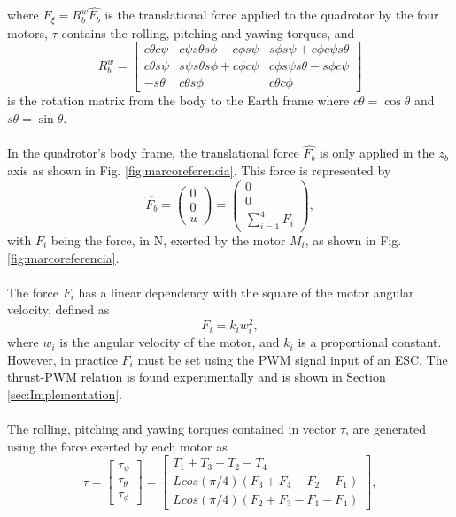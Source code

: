 where $F_{\xi}=R_{b}^{w}\hat{F_{b}}$ is the translational force applied to the quadrotor by the four motors, $\tau$ contains the rolling, pitching and yawing torques, and 
\begin{equation}
R_{b}^{w} = \begin{bmatrix}
c\theta c\psi & c\psi s\theta s\phi-c\phi s\psi & s\phi s\psi+c\phi c\psi s\theta\\
c\theta s\psi & s\psi s\theta s\phi+c\phi c\psi & c\phi s\psi s\theta - s\phi c\psi\\
-s\theta & c\theta s\phi & c\theta c\phi
\end{bmatrix}
\end{equation}
is the rotation matrix from the body to the Earth frame where $c\theta = \cos\theta$ and $s\theta = \sin\theta$.
\\\\
In the quadrotor's body frame, the translational force $\hat{F_{b}}$ is only applied in the $z_{b}$ axis as shown in Fig. \ref{fig:marcoreferencia}. This force is represented by
\begin{equation}
	\hat{F_{b}}=\begin{pmatrix}
	0\\
	0\\
	u
	\end{pmatrix} = \begin{pmatrix}
	0\\
	0\\
	\sum_{i=1}^{4}F_{i}
	\end{pmatrix}  ,
 \label{ec:fuerzas}
 \end{equation} 
with $ F_{i} $ being the force, in N, exerted by the motor $ M_{i}$, as shown in Fig. \ref{fig:marcoreferencia}.
\\\\
The force $ F_{i} $ has a linear dependency with the square of the motor angular velocity, defined as
\begin{equation}
	F_{i}=k_{i}w_{i}^{2},
	\label{ec:fi}
\end{equation}
where $ w_{i} $ is the angular velocity of the motor, and $ k_{i} $ is a proportional constant. However, in practice $F_{i}$ must be set using the PWM signal input of an ESC. The thrust-PWM relation is found experimentally and is shown in Section \ref{sec:Implementation}.
\\\\
The rolling, pitching and yawing torques contained in vector $\tau$, are generated using the force exerted by each motor as
\begin{equation}
	\tau = \begin{bmatrix}
	\tau_{\psi}\\
	\tau_{\theta}\\
	\tau_{\phi}
	\end{bmatrix} = \begin{bmatrix}
								T_{1} + T_{3} - T_{2} - T_{4}\\
								Lcos(\pi/4)(F_{3}+F_{4}-F_{2}-F_{1})\\
								Lcos(\pi/4)(F_{2}+F_{3}-F_{1}-F_{4})
							\end{bmatrix},
	\label{ec:torques}						
\end{equation}
